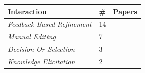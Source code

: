 \begin{tabular} {p{} p{} p{}} \\ 
\toprule 
Interaction & \# & Papers\\ 
\midrule  
\emph{Feedback-Based Refinement} & 14 & \cite{ \paperninth,\papersixtyeighth,\paperseventieth,\papereightythird,\paperninetyfifth,\paperninetysixth,\paperonehundredseventh,\paperonehundredtwentyeighth,\paperonehundredthirtyninth,\paperonehundredeightyninth,\paperonehundredninetyfourth,\papertwohundredtwelfth,\papertwohundredfortieth,\papertwohundredfiftyfirst }\\ 
\emph{Manual Editing} & 7 & \cite{ \paperfiftyfifth,\paperonehundredseventh,\paperonehundredsixtysecond,\paperonehundredsixtysixth,\paperonehundredseventieth,\paperonehundredninetysixth,\papertwohundredthirtyfourth }\\ 
\emph{Decision Or Selection} & 3 & \cite{ \paperthirteenth,\paperfourteenth,\paperonehundredseventysixth }\\ 
\emph{Knowledge Elicitation} & 2 & \cite{ \paperonehundredfiftyeighth,\paperonehundredninetieth }\\ 
\bottomrule 
\end{tabular} 
